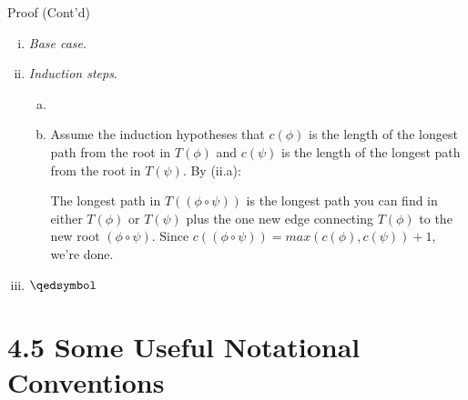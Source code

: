 \documentclass[../slides.tex]{subfiles}
\begin{document}
\begin{frame}{Proof (Cont'd)}

\begin{enumerate}[(i)]
		
			\item \emph{Base case}. \checkmark
			
			\item \emph{Induction steps}. 
				\begin{enumerate}[(a)]

					\item \checkmark
					
					\item Assume the induction hypotheses that $c(\phi)$ is the length of the longest path from the root in $T(\phi)$ and $c(\psi)$ is the length of the longest path from the root in $T(\psi)$. By (ii.a):
					\begin{center}
\end{center}
The longest path in $T((\phi\circ\psi))$ is the longest path you can find in either $T(\phi)$ or $T(\psi)$ plus the one new edge connecting $T(\phi)$ to the new root $(\phi\circ\psi)$. Since $c((\phi\circ\psi))=max(c(\phi),c(\psi))+1$, we're done. 

		
		\end{enumerate}
		
		\item[] $\qedsymbol$
		
		\end{enumerate}
	
\end{frame}

\section{4.5 Some Useful Notational Conventions}
\end{document}
